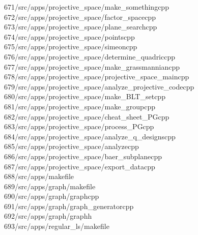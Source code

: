 \begin{tabbing}
671\>/src/apps/projective\_space/make\_somethingcpp\\[0pt]
672\>/src/apps/projective\_space/factor\_spacecpp\\[0pt]
673\>/src/apps/projective\_space/plane\_searchcpp\\[0pt]
674\>/src/apps/projective\_space/pointscpp\\[0pt]
675\>/src/apps/projective\_space/simeoncpp\\[0pt]
676\>/src/apps/projective\_space/determine\_quadriccpp\\[0pt]
677\>/src/apps/projective\_space/make\_grassmanniancpp\\[0pt]
678\>/src/apps/projective\_space/projective\_space\_maincpp\\[0pt]
679\>/src/apps/projective\_space/analyze\_projective\_codecpp\\[0pt]
680\>/src/apps/projective\_space/make\_BLT\_setcpp\\[0pt]
681\>/src/apps/projective\_space/make\_groupcpp\\[0pt]
682\>/src/apps/projective\_space/cheat\_sheet\_PGcpp\\[0pt]
683\>/src/apps/projective\_space/process\_PGcpp\\[0pt]
684\>/src/apps/projective\_space/analyze\_q\_designscpp\\[0pt]
685\>/src/apps/projective\_space/analyzecpp\\[0pt]
686\>/src/apps/projective\_space/baer\_subplanecpp\\[0pt]
687\>/src/apps/projective\_space/export\_datacpp\\[0pt]
688\>/src/apps/makefile\\[0pt]
689\>/src/apps/graph/makefile\\[0pt]
690\>/src/apps/graph/graphcpp\\[0pt]
691\>/src/apps/graph/graph\_generatorcpp\\[0pt]
692\>/src/apps/graph/graphh\\[0pt]
693\>/src/apps/regular\_ls/makefile\\[0pt]

\end{tabbing}
